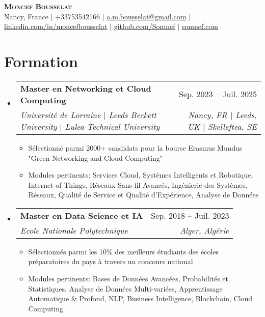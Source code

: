 \documentclass[letterpaper,12t]{article}
\makeatletter
\newcommand{\resumeItem}[1]{
  \item\small{
    {#1 \vspace{-2pt}}
  }
}
\newcommand{\resumeSubheading}[4]{
  \vspace{-2pt}\item
    \begin{tabular*}{0.97\textwidth}[t]{l@{\extracolsep{\fill}}r}
      \textbf{#1} & #2 \\
      \textit{\small#3} & \textit{\small #4} \\
    \end{tabular*}\vspace{-7pt}
}
\newcommand{\resumeSubHeadingListStart}{\begin{itemize}[leftmargin=0.15in, label={}]}
\newcommand{\resumeSubHeadingListEnd}{\end{itemize}}
\newcommand{\resumeItemListStart}{\begin{itemize}}
\newcommand{\resumeItemListEnd}{\end{itemize}\vspace{-5pt}}
\makeatother
\begin{document}

\begin{center}
    \textbf{\Huge \scshape Moncef Bousselat} \\ \vspace{1pt}
    \small Nancy, France $|$ 
    \small +33753542166 $|$ 
    \href{mailto:a.m.bousselat@gmail.com@gmail.com}{\underline{a.m.bousselat@gmail.com}} $|$ 
    \href{https://www.linkedin.com/in/moncefbousselat/}{\underline{linkedin.com/in/moncefbousselat}} $|$
    \href{https://github.com/Somnef}{\underline{github.com/Somnef}} $|$
    \href{https://www.somnef.com}{\underline{somnef.com}}
\end{center}


\section{Formation}
    \resumeSubHeadingListStart
        \resumeSubheading
        {Master en Networking et Cloud Computing}{Sep. 2023 -- Juil. 2025}
        {Université de Lorraine $|$ Leeds Beckett University $|$ Lulea Technical University}{Nancy, FR $|$ Leeds, UK $|$ Skelleftea, SE}
            \resumeItemListStart
                \resumeItem{Sélectionné parmi 2000+ candidats pour la bourse Erasmus Mundus "Green Networking and Cloud Computing"}
                \resumeItem{Modules pertinents: Services Cloud, Systèmes Intelligents et Robotique, Internet of Things, Réseaux Sans-fil Avancés, Ingénierie des Systèmes, Réseaux, Qualité de Service et Qualité d'Expérience, Analyse de Données}
            \resumeItemListEnd
      
        \resumeSubheading
        {Master en Data Science et IA}{Sep. 2018 -- Juil. 2023}
        {Ecole Nationale Polytechnique}{Alger, Algérie}
            \resumeItemListStart
                \resumeItem{Sélectionnés parmi les 10\% des meilleurs étudiants des écoles préparatoires du pays à travers un concours national}
                \resumeItem{Modules pertinents: Bases de Données Avancées, Probabilités et Statistiques, Analyse de Données Multi-variées, Apprentissage Automatique \& Profond, NLP, Business Intelligence, Blockchain, Cloud Computing}
            \resumeItemListEnd
  \resumeSubHeadingListEnd
\end{document}
